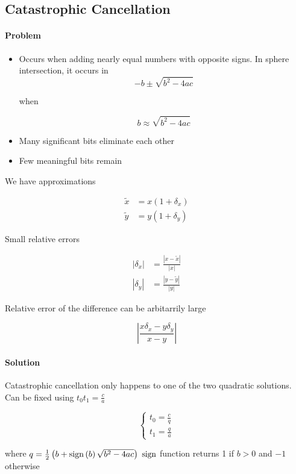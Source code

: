   \subsection{Catastrophic Cancellation}

    \paragraph{Problem}
    \begin{itemize}
      \item Occurs when adding nearly equal numbers with opposite signs.
      In sphere intersection, it occurs in
      \begin{equation*}
        -b \pm \sqrt{b^{2} - 4ac}
      \end{equation*}

      when

      \begin{equation*}
        b \approx \sqrt{b^{2} - 4ac}
      \end{equation*}

      \item Many significant bits eliminate each other
      \item Few meaningful bits remain
    \end{itemize}

    We have approximations

    \begin{align}
      \tilde{x} &= x \left( 1 + \delta_{x} \right) \\
      \tilde{y} &= y \left( 1 + \delta_{y} \right)
    \end{align}

    Small relative errors

    \begin{align}
      \left| \delta_{x} \right| &= \frac{\left| x - \tilde{x} \right|}{\left| x \right|} \\
      \left| \delta_{y} \right| &= \frac{\left| y - \tilde{y} \right|}{\left| y \right|}
    \end{align}

    Relative error of the difference can be arbitarrily large

    \begin{equation}
      \left| \frac{x \delta_{x} - y \delta_{y}}{x - y} \right|
    \end{equation}

    \paragraph{Solution} Catastrophic cancellation only happens to one of the
    two quadratic solutions. Can be fixed using $ t_{0} t_{1} = \frac{c}{a} $

    \begin{equation}
      \begin{cases}
        t_{0} = \frac{c}{q} \\
        t_{1} = \frac{q}{a}
      \end{cases}
    \end{equation}

    where $ q = \frac{1}{2}\left( b + \operatorname{sign}\left( b \right) \sqrt{b^{2} - 4ac} \right) $
    $ \operatorname{sign} $ function returns 1 if $ b > 0 $ and $ - 1 $ otherwise
